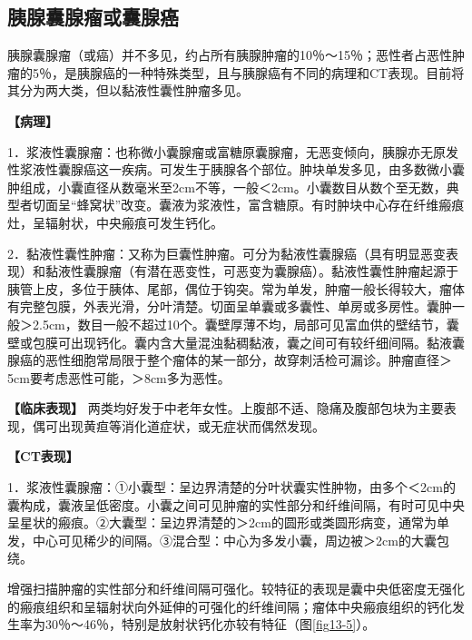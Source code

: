 \subsection{胰腺囊腺瘤或囊腺癌}

胰腺囊腺瘤（或癌）并不多见，约占所有胰腺肿瘤的10％～15％；恶性者占恶性肿瘤的5％，是胰腺癌的一种特殊类型，且与胰腺癌有不同的病理和CT表现。目前将其分为两大类，但以黏液性囊性肿瘤多见。

\textbf{【病理】}

1．浆液性囊腺瘤：也称微小囊腺瘤或富糖原囊腺瘤，无恶变倾向，胰腺亦无原发性浆液性囊腺癌这一疾病。可发生于胰腺各个部位。肿块单发多见，由多数微小囊肿组成，小囊直径从数毫米至2cm不等，一般＜2cm。小囊数目从数个至无数，典型者切面呈“蜂窝状”改变。囊液为浆液性，富含糖原。有时肿块中心存在纤维瘢痕灶，呈辐射状，中央瘢痕可发生钙化。

2．黏液性囊性肿瘤：又称为巨囊性肿瘤。可分为黏液性囊腺癌（具有明显恶变表现）和黏液性囊腺瘤（有潜在恶变性，可恶变为囊腺癌）。黏液性囊性肿瘤起源于胰管上皮，多位于胰体、尾部，偶位于钩突。常为单发，肿瘤一般长得较大，瘤体有完整包膜，外表光滑，分叶清楚。切面呈单囊或多囊性、单房或多房性。囊肿一般＞2.5cm，数目一般不超过10个。囊壁厚薄不均，局部可见富血供的壁结节，囊壁或包膜可出现钙化。囊内含大量混浊黏稠黏液，囊之间可有较纤细间隔。黏液囊腺癌的恶性细胞常局限于整个瘤体的某一部分，故穿刺活检可漏诊。肿瘤直径＞5cm要考虑恶性可能，＞8cm多为恶性。

\textbf{【临床表现】}
两类均好发于中老年女性。上腹部不适、隐痛及腹部包块为主要表现，偶可出现黄疸等消化道症状，或无症状而偶然发现。

\textbf{【CT表现】}

1．浆液性囊腺瘤：①小囊型：呈边界清楚的分叶状囊实性肿物，由多个＜2cm的囊构成，囊液呈低密度。小囊之间可见肿瘤的实性部分和纤维间隔，有时可见中央呈星状的瘢痕。②大囊型：呈边界清楚的＞2cm的圆形或类圆形病变，通常为单发，中心可见稀少的间隔。③混合型：中心为多发小囊，周边被＞2cm的大囊包绕。

增强扫描肿瘤的实性部分和纤维间隔可强化。较特征的表现是囊中央低密度无强化的瘢痕组织和呈辐射状向外延伸的可强化的纤维间隔；瘤体中央瘢痕组织的钙化发生率为30％～46％，特别是放射状钙化亦较有特征（图\ref{fig13-5}）。

